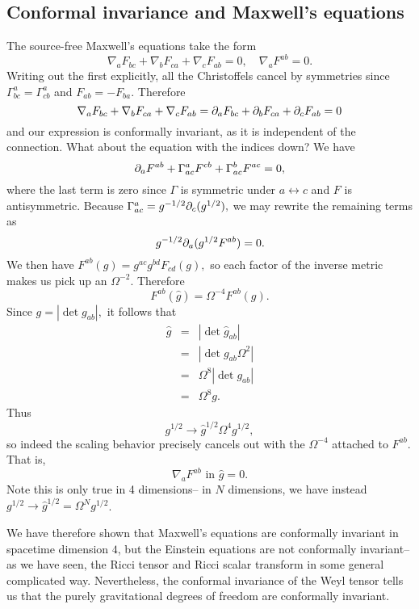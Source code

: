 \subsection*{Conformal invariance and Maxwell's equations} The source-free Maxwell's equations take the form
$$\nabla_a F_{bc}+\nabla_b F_{ca}+\nabla_c F_{ab}=0, \quad \nabla_a F^{ab}=0.$$
Writing out the first explicitly, all the Christoffels cancel by symmetries since $\Gamma^a_{bc}=\Gamma^a_{cb}$ and $F_{ab}=-F_{ba}.$ Therefore 
$$\nabla_a F_{bc}+\nabla_b F_{ca}+\nabla_c F_{ab}= \partial_a F_{bc} + \partial_b F_{ca}+\partial_c F_{ab}=0$$ and our expression is conformally invariant, as it is independent of the connection. What about the equation with the indices down? We have
$$\partial_a F^{ab}+\Gamma^a_{ac} F^{cb}+\Gamma^b_{ac} F^{ac}=0,$$
where the last term is zero since $\Gamma$ is symmetric under $a\leftrightarrow c$ and $F$ is antisymmetric. Because $\Gamma^a_{ac}=g^{-1/2}\partial_c (g^{1/2}),$ we may rewrite the remaining terms as
$$g^{-1/2}\partial_a (g^{1/2}F^{ab})=0.$$
We then have $F^{ab}(g)=g^{ac} g^{bd}F_{cd}(g),$ so each factor of the inverse metric makes us pick up an $\Omega^{-2}$. Therefore
$$F^{ab}(\hat g)=\Omega^{-4}F^{ab}(g).$$
Since $g=|\det g_{ab}|,$ it follows that
\begin{eqnarray*}
\hat g&=&|\det \hat g_{ab}|\\
&=&|\det g_{ab} \Omega^2|\\
&=&\Omega^8 |\det g_{ab}|\\
&=&\Omega^8 g.
\end{eqnarray*}
Thus $$g^{1/2}\to \hat g^{1/2}\Omega^4 g^{1/2},$$ so indeed the scaling behavior precisely cancels out with the $\Omega^{-4}$ attached to $F^{ab}$. That is,
$$\nabla_a F^{ab}\text{ in }\hat g=0.$$
Note this is only true in 4 dimensions-- in $N$ dimensions, we have instead $g^{1/2}\to \hat g^{1/2}=\Omega^N g^{1/2}$.

We have therefore shown that Maxwell's equations are conformally invariant in spacetime dimension $4$, but the Einstein equations are not conformally invariant-- as we have seen, the Ricci tensor and Ricci scalar transform in some general complicated way. Nevertheless, the conformal invariance of the Weyl tensor tells us that the purely gravitational degrees of freedom are conformally invariant.

